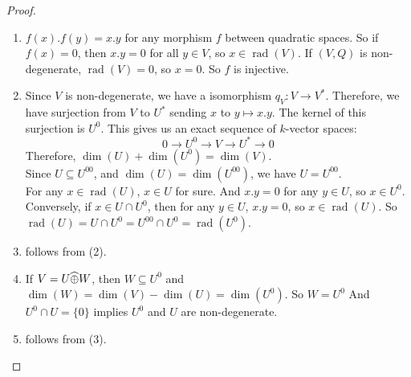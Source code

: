 \documentclass[15pt]{scrartcl}
\newcommand{\rad}{\operatorname{rad}}
\newcommand{\po}{\wh{\oplus}}
\begin{document}
\begin{proof}
    \begin{enumerate}
        \item $f(x).f(y)=x.y$ for any morphism $f$ between quadratic spaces. So if $f(x)=0$, then $x.y=0$ for all $y\in V$, so $x\in \rad(V)$. If $(V,Q)$ is non-degenerate, $\rad(V)=0$, so $x=0$. So $f$ is injective.
        \item Since $V$ is non-degenerate, we have a isomorphism $q_V: V\to V^*$. Therefore, we have surjection from $V$ to $U^*$ sending $x$ to $y\mapsto x.y$. The kernel of this surjection is $U^0$. This gives us an exact sequence of $k$-vector spaces: 
        \[0\to U^0\to V\to U^* \to 0\]
        Therefore, $\dim(U)+\dim(U^0)=\dim(V)$. 
        \\

        Since $U\subseteq U^{00}$, and $\dim(U)=\dim(U^{00})$, we have $U=U^{00}$.
        \\

        For any $x\in \rad(U)$, $x\in U$ for sure. And $x.y=0$ for any $y\in U$, so $x\in U^0$. Conversely, if $x\in U\cap U^0$, then for any $y\in U$, $x.y=0$, so $x\in \rad(U)$. So $\rad(U)=U\cap U^0=U^{00}\cap U^{0}=\rad(U^0)$.
        \item follows from (2).
        \item If $V=U\po W$, then $W\subseteq U^0$ and $\dim(W)=\dim(V)-\dim(U)=\dim(U^0)$. So $W=U^0$ And $U^0\cap U=\{0\}$ implies $U^0$ and $U$ are non-degenerate.
        \item follows from (3).
    \end{enumerate}
\end{proof}
\end{document}
